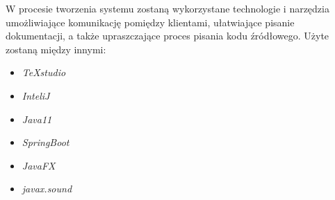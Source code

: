 W procesie tworzenia systemu zostaną wykorzystane technologie i narzędzia umożliwiające komunikację pomiędzy klientami, ułatwiające pisanie dokumentacji, a także upraszczające proces pisania kodu źródłowego. Użyte zostaną między innymi:
\begin{itemize}
	\item \textit{TeXstudio}
	\item \textit{InteliJ}
	\item \textit{Java11}
	\item \textit{SpringBoot}
	\item \textit{JavaFX}
	\item \textit{javax.sound}
\end{itemize}

